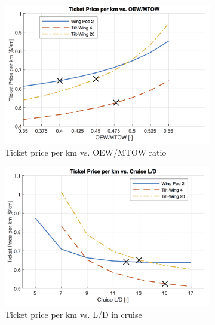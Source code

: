 \begin{figure}[h]
\begin{subfigure}[t]{0.33\textwidth}
    \centering
    \includegraphics[width=\textwidth]{Figures/OEWMTOW_TPrice_perkmNOPAD.png}
    \captionsetup{justification=centering}
    \caption{Ticket price per km vs. OEW/MTOW ratio}
    \label{fig:sens4}
\end{subfigure}
\begin{subfigure}[t]{0.33\textwidth}
    \centering
    \includegraphics[width=\textwidth]{Figures/LoD_TPrice_perkmNOPAD.png}
    \captionsetup{justification=centering}
    \caption{Ticket price per km vs. L/D in cruise}
    \label{fig:sens5}
\end{subfigure}
\begin{subfigure}[t]{0.33\textwidth}
    \centering

\end{subfigure}
\end{figure}
